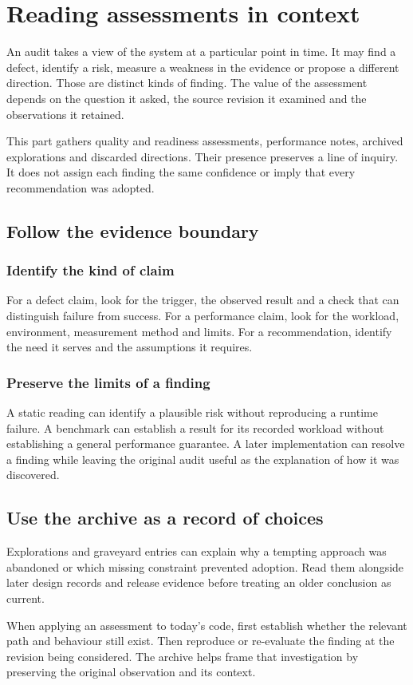 \chapter*{Reading assessments in context}

An audit takes a view of the system at a particular point in time. It may find a defect, identify a risk, measure a weakness in the evidence or propose a different direction. Those are distinct kinds of finding. The value of the assessment depends on the question it asked, the source revision it examined and the observations it retained.

This part gathers quality and readiness assessments, performance notes, archived explorations and discarded directions. Their presence preserves a line of inquiry. It does not assign each finding the same confidence or imply that every recommendation was adopted.

\section*{Follow the evidence boundary}

\subsection*{Identify the kind of claim}

For a defect claim, look for the trigger, the observed result and a check that can distinguish failure from success. For a performance claim, look for the workload, environment, measurement method and limits. For a recommendation, identify the need it serves and the assumptions it requires.

\subsection*{Preserve the limits of a finding}

A static reading can identify a plausible risk without reproducing a runtime failure. A benchmark can establish a result for its recorded workload without establishing a general performance guarantee. A later implementation can resolve a finding while leaving the original audit useful as the explanation of how it was discovered.

\section*{Use the archive as a record of choices}

Explorations and graveyard entries can explain why a tempting approach was abandoned or which missing constraint prevented adoption. Read them alongside later design records and release evidence before treating an older conclusion as current.

When applying an assessment to today's code, first establish whether the relevant path and behaviour still exist. Then reproduce or re-evaluate the finding at the revision being considered. The archive helps frame that investigation by preserving the original observation and its context.

